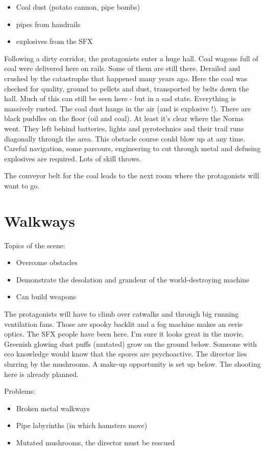 \begin{itemize}
\item Coal dust (potato cannon, pipe bombs)
\item pipes from handrails
\item explosives from the SFX
\end{itemize}

Following a dirty corridor, the protagonists enter a huge hall. Coal wagons full of coal were delivered here on rails. Some of them are still there. Derailed and crushed by the catastrophe that happened many years ago. Here the coal was checked for quality, ground to pellets and dust, transported by belts down the hall. Much of this can still be seen here - but in a sad state.
Everything is massively rusted. The coal dust hangs in the air (and is explosive !). There are black puddles on the floor (oil and coal).
At least it's clear where the Norms went. They left behind batteries, lights and pyrotechnics and their trail runs diagonally through the area. This obstacle course could blow up at any time. Careful navigation, some parcours, engineering to cut through metal and defusing explosives are required. Lots of skill throws.

The conveyor belt for the coal leads to the next room where the protagonists will want to go.


\section{Walkways}

Topics of the scene:
\begin{itemize}
\item Overcome obstacles
\item Demonstrate the desolation and grandeur of the world-destroying machine
\item Can build weapons
\end{itemize}

The protagonists will have to climb over catwalks and through big running ventilation fans.
Those are spooky backlit and a fog machine makes an eerie optics. The SFX people have been here. I'm sure it looks great in the movie.
Greenish glowing dust puffs (mutated) grow on the ground below. Someone with eco knowledge would know that the spores are psychoactive. The director lies slurring by the mushrooms.
A make-up opportunity is set up below. The shooting here is already planned.

Problems:
\begin{itemize}
\item Broken metal walkways
\item Pipe labyrinths (in which hamsters move)
\item Mutated mushrooms, the director must be rescued
\end{itemize}

